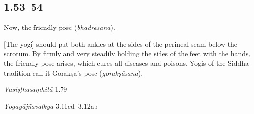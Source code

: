 \begin{ekdosis}





\subsection*{1.53--54}
\begin{translation}[hp01_053]
Now, the friendly pose (\emph{bhadrāsana}).

[The yogi] should put both ankles at the sides of the perineal seam below the scrotum.  By firmly and very steadily holding the sides of the feet with the hands, the friendly pose arises, which cures all diseases and poisons. Yogis of the Siddha tradition call it Gorakṣa's pose (\emph{gorakṣāsana}).
\end{translation}

\begin{sources}[hp01_053]
\emph{Vasiṣṭhasaṃhitā} 1.79

\begin{versinnote}
\end{versinnote}

\emph{Yogayājñavalkya} 3.11cd--3.12ab

\begin{versinnote}
\end{versinnote}


\end{sources}
\end{ekdosis}
